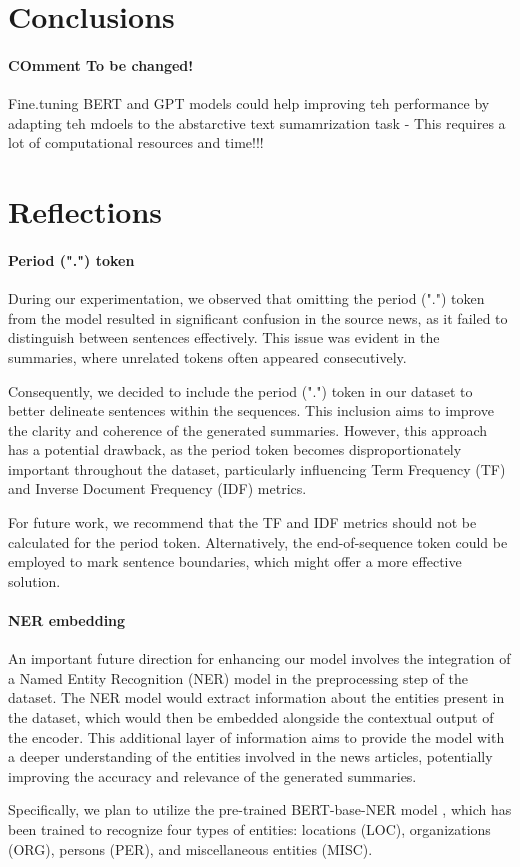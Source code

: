 \section{Conclusions}
\paragraph{COmment To be changed!}Fine.tuning BERT and GPT models could help improving teh performance by adapting teh mdoels to the abstarctive text sumamrization task - This requires a lot of computational resources and time!!!

\section{Reflections}
\paragraph{Period (".") token}
During our experimentation, we observed that omitting the period (".") token from the model resulted in significant confusion in the source news, as it failed to distinguish between sentences effectively. This issue was evident in the summaries, where unrelated tokens often appeared consecutively.

Consequently, we decided to include the period (".") token in our dataset to better delineate sentences within the sequences. This inclusion aims to improve the clarity and coherence of the generated summaries. However, this approach has a potential drawback, as the period token becomes disproportionately important throughout the dataset, particularly influencing Term Frequency (TF) and Inverse Document Frequency (IDF) metrics.

For future work, we recommend that the TF and IDF metrics should not be calculated for the period token. Alternatively, the end-of-sequence token could be employed to mark sentence boundaries, which might offer a more effective solution.

\paragraph{NER embedding}
An important future direction for enhancing our model involves the integration of a Named Entity Recognition (NER) model in the preprocessing step of the dataset. The NER model would extract information about the entities present in the dataset, which would then be embedded alongside the contextual output of the encoder. This additional layer of information aims to provide the model with a deeper understanding of the entities involved in the news articles, potentially improving the accuracy and relevance of the generated summaries. 

Specifically, we plan to utilize the pre-trained BERT-base-NER model \citep{BERTNER}, which has been trained to recognize four types of entities: locations (LOC), organizations (ORG), persons (PER), and miscellaneous entities (MISC). 

